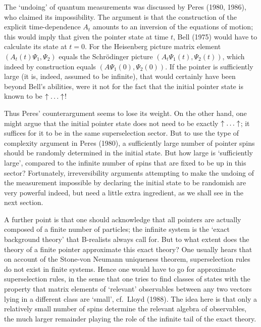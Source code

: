The `undoing' of quantum measurements was discussed by Peres (1980, 1986), who
claimed its
impossibility. The argument is that the construction of the  explicit
time-dependence $A_t$ amounts
to an inversion of the equations of motion; this would imply that given the
pointer state at time
$t$,    Bell (1975)  would have to calculate its state at $t=0$. For the
Heisenberg
picture matrix element $(A_t(t)\Psi_1,\Psi_2)$ equals the Schr\"{o}dinger
picture
$(A_t\Psi_1(t),\Psi_2(t))$, which indeed by construction equals
$(A\Psi_1(0),\Psi_2(0))$. If the
pointer is sufficiently large (it is, indeed, assumed to be infinite), that
would certainly have been
beyond Bell's abilities, were it not for the fact that the initial pointer
state is known to be $\uparrow\ldots\uparrow$!

Thus Peres' counterargument seems to lose its weight. On the other hand, one
might argue that the
initial pointer state does not need to be exactly $\uparrow\ldots\uparrow$; it suffices for it to
be in the same
superselection sector. But to use the type of complexity argument in Peres
(1980), a sufficiently
large number of pointer spins should be randomly determined in the initial
state. But how large is
`sufficiently large', compared to the infinite number of spins that are fixed
to be up in this
sector? Fortunately, irreversibility arguments attempting to make the
undoing of the measurement impossible by declaring  the initial state to be
randomish are very
powerful indeed, but need a little extra ingredient, as we shall see in the
next section.

A further point is that one should acknowledge that all pointers are actually
composed of a finite
number of particles; the
infinite system is the `exact background theory' that B-realists always call
for. But to what extent
does the theory of a finite pointer approximate this exact theory? One usually
hears that on account
of the Stone-von Neumann uniqueness theorem, superselection rules do not exist
in finite systems.
Hence one would have to go for approximate superselection rules, in the sense
that one tries to find
classes of states with the property that matrix elements of `relevant'
observables between any two
vectors lying in a different class are `small', cf.\ Lloyd (1988). The idea
here is that only a
relatively small number of spins determine the  relevant algebra of
observables, the much larger
remainder playing the role of the infinite tail of the exact theory.

